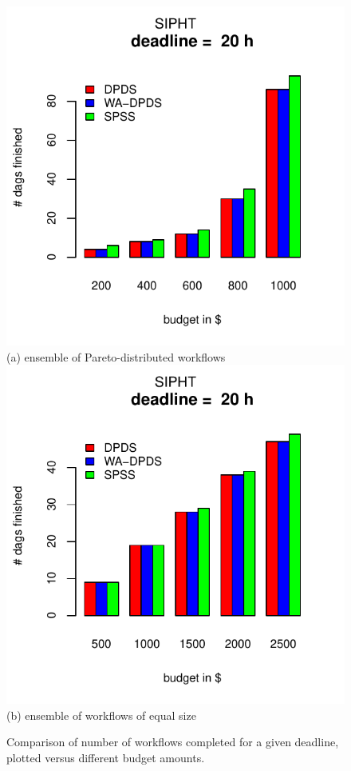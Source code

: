 \documentclass{sig-alternate}
\begin{document}
\begin{figure}[htb] \centering
\includegraphics[width=0.7\columnwidth]{figures/pareto-budget-SIPHT-n-1000-8-dagh5-50h4m0.pdf}\\
(a) ensemble of Pareto-distributed workflows
\includegraphics[width=0.7\columnwidth]{figures/constant-budget-SIPHT-n-1000-0-dagh5-50h4m0.pdf}\\
(b) ensemble of workflows of equal size \caption{Comparison of number of
workflows completed for a given deadline, plotted versus different budget
amounts.}
\label{fig:budgets}
\end{figure}
\end{document}
